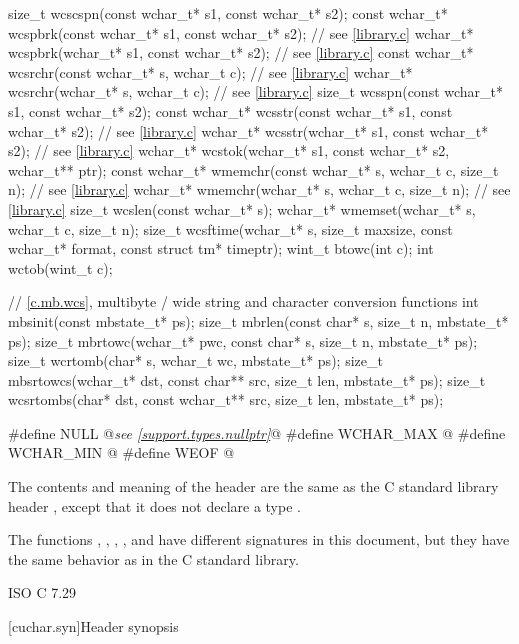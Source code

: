 \begin{codeblock}
{  size_t wcscspn(const wchar_t* s1, const wchar_t* s2);
  const wchar_t* wcspbrk(const wchar_t* s1, const wchar_t* s2);  // see \ref{library.c}
  wchar_t* wcspbrk(wchar_t* s1, const wchar_t* s2);  // see \ref{library.c}
  const wchar_t* wcsrchr(const wchar_t* s, wchar_t c);  // see \ref{library.c}
  wchar_t* wcsrchr(wchar_t* s, wchar_t c);  // see \ref{library.c}
  size_t wcsspn(const wchar_t* s1, const wchar_t* s2);
  const wchar_t* wcsstr(const wchar_t* s1, const wchar_t* s2);  // see \ref{library.c}
  wchar_t* wcsstr(wchar_t* s1, const wchar_t* s2);  // see \ref{library.c}
  wchar_t* wcstok(wchar_t* s1, const wchar_t* s2, wchar_t** ptr);
  const wchar_t* wmemchr(const wchar_t* s, wchar_t c, size_t n);  // see \ref{library.c}
  wchar_t* wmemchr(wchar_t* s, wchar_t c, size_t n);  // see \ref{library.c}
  size_t wcslen(const wchar_t* s);
  wchar_t* wmemset(wchar_t* s, wchar_t c, size_t n);
  size_t wcsftime(wchar_t* s, size_t maxsize, const wchar_t* format, const struct tm* timeptr);
  wint_t btowc(int c);
  int wctob(wint_t c);

  // \ref{c.mb.wcs}, multibyte / wide string and character conversion functions
  int mbsinit(const mbstate_t* ps);
  size_t mbrlen(const char* s, size_t n, mbstate_t* ps);
  size_t mbrtowc(wchar_t* pwc, const char* s, size_t n, mbstate_t* ps);
  size_t wcrtomb(char* s, wchar_t wc, mbstate_t* ps);
  size_t mbsrtowcs(wchar_t* dst, const char** src, size_t len, mbstate_t* ps);
  size_t wcsrtombs(char* dst, const wchar_t** src, size_t len, mbstate_t* ps);
}

#define NULL @\textit{see \ref{support.types.nullptr}}@
#define WCHAR_MAX @\seebelow@
#define WCHAR_MIN @\seebelow@
#define WEOF @\seebelow@
\end{codeblock}

\pnum
{}%
The contents and meaning of the header 
are the same as the C standard library header
, except that it does not declare a type .

\pnum
\begin{note}
The functions
, , , , and 
have different signatures in this document,
but they have the same behavior as in the C standard library.
\end{note}

\xref ISO C 7.29

[cuchar.syn]{Header  synopsis}


